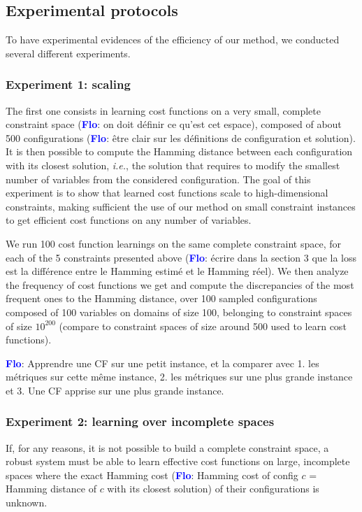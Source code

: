 \documentclass{article}
\newcommand{\ie}{\textit{i.e.}}
\newcommand{\flo}{\textcolor{blue}{\bf Flo}\xspace}
\begin{document}
\subsection{Experimental protocols}

To have  experimental evidences  of the efficiency  of our  method, we
conducted several different experiments.

\subsubsection{Experiment 1: scaling}

The first  one consists in  learning cost  functions on a  very small,
complete  constraint  space  (\flo:  on doit  définir  ce  qu'est  cet
espace), composed  of about 500  configurations (\flo: être  clair sur
les définitions de configuration et solution).  It is then possible to
compute  the  Hamming distance  between  each  configuration with  its
closest  solution,  \ie, the  solution  that  requires to  modify  the
smallest number  of variables  from the considered  configuration. The
goal of this  experiment is to show that learned  cost functions scale
to  high-dimensional constraints,  making  sufficient the  use of  our
method on small  constraint instances to get  efficient cost functions
on any number of variables.

We run  100 cost  function learnings on  the same  complete constraint
space, for  each of  the 5 constraints  presented above  (\flo: écrire
dans  la section  3 que  la loss  est la  différence entre  le Hamming
estimé et le Hamming réel). We then analyze
the frequency of  cost functions we get and  compute the discrepancies
of the  most frequent ones to  the Hamming distance, over  100 sampled
configurations  composed of  100  variables on  domains  of size  100,
belonging  to  constraint  spaces   of  size  $10^{200}$  (compare  to
constraint spaces of size around 500 used to learn cost functions).

\flo: Apprendre une CF sur une petit instance, et la comparer avec 1. les
métriques  sur cette  même instance,  2.  les métriques  sur une  plus
grande instance et 3. Une CF apprise sur une plus grande instance.

\subsubsection{Experiment 2: learning over incomplete spaces}

If, for any reasons, it is not possible to build a complete constraint
space, a robust system must be  able to learn effective cost functions
on  large,  incomplete spaces  where  the  exact Hamming  cost  (\flo:
Hamming cost of config $c$ =  Hamming distance of $c$ with its closest
solution) of their configurations is unknown.
\end{document}
